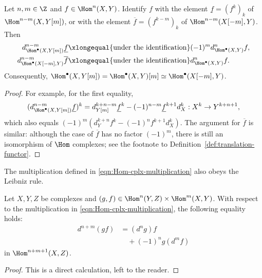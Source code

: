 \begin{lemma}\label{prop:Hom-cplx-d-translate}
	Let $n,m\in\Z$ and $f\in\Hom^n(X,Y)$. Identify $f$ with the element
	$\underline{f}=(f^k)_k$ of $\Hom^{n-m}(X,Y[m])$, or with the element
	$\overline{f}=(f^{k-m})_k$ of $\Hom^{n-m}(X[-m],Y)$. Then
	\begin{align*}
		d^{n-m}_{\Hom^\bullet(X, Y[m])} \underline{f} & \xlongequal{\text{under the identification}} (-1)^m d^n_{\Hom^\bullet(X, Y)} f, \\ d^{n-m}_{\Hom^\bullet(X[-m], Y)} \overline{f} & \xlongequal{\text{under the identification}} d^n_{\Hom^\bullet(X, Y)} f.
	\end{align*}
	Consequently,
	$\Hom^\bullet(X,Y[m])=\Hom^\bullet(X,Y)[m]\simeq
	\Hom^\bullet(X[-m],Y)$.
\end{lemma}
\begin{proof}
	For example, for the first equality,
	\[ (d^{n-m}_{\Hom^\bullet(X, Y[m])} \underline{f})^k = d_{Y[m]}^{k+n-m} \underline{f}^k - (-1)^{n-m} \underline{f}^{k+1} d_X^k : X^k \to Y^{k+n+1}, \]
	which also equals
	$(-1)^m\left(d_Y^{k+n}f^k-(-1)^nf^{k+1}d_X^k\right)$. The argument for
	$\overline{f}$ is similar: although the case of $\overline{f}$ has no
	factor $(-1)^m$, there is still an isomorphism of $\Hom$ complexes; see
	the footnote to Definition~\ref{def:translation-functor}.
\end{proof}

The multiplication defined in \eqref{eqn:Hom-cplx-multiplication} also obeys
the Leibniz rule.

\begin{lemma}\label{prop:Hom-cplx-Leibniz}
	Let $X,Y,Z$ be complexes and
	$(g,f)\in\Hom^n(Y,Z)\times\Hom^m(X,Y)$. With respect to the
	multiplication in \eqref{eqn:Hom-cplx-multiplication}, the following
	equality holds:
	\[
		\begin{aligned}
			d^{n+m}(gf)
				&= (d^n g)f \\
				&\quad + (-1)^n g(d^m f)
		\end{aligned}
	\]
	in $\Hom^{n+m+1}(X,Z)$.
\end{lemma}
\begin{proof}
	This is a direct calculation, left to the reader.
\end{proof}

